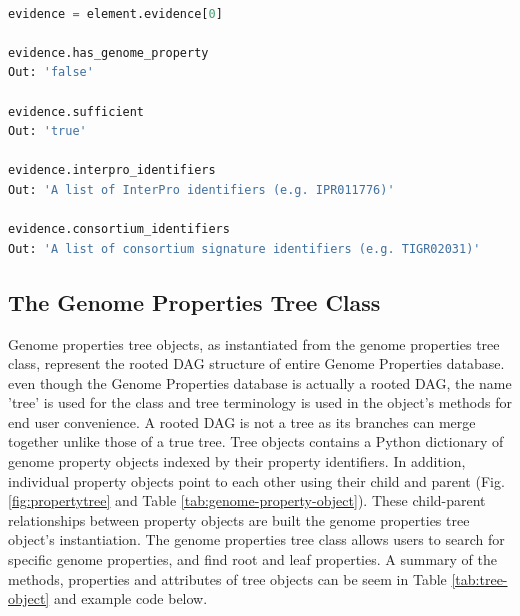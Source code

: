 \begin{lstlisting}[language=Python]

evidence = element.evidence[0]
	
evidence.has_genome_property
Out: 'false'

evidence.sufficient
Out: 'true'

evidence.interpro_identifiers
Out: 'A list of InterPro identifiers (e.g. IPR011776)'

evidence.consortium_identifiers 
Out: 'A list of consortium signature identifiers (e.g. TIGR02031)'

\end{lstlisting}

\subsection{The Genome Properties Tree Class}

Genome properties tree objects, as instantiated from the genome properties tree class, represent the rooted DAG structure of entire Genome Properties database. even though the Genome Properties database is actually a rooted DAG, the name 'tree' is used for the class and tree terminology is used in the object's methods for end user convenience. A rooted DAG is not a tree as its branches can merge together unlike those of a true tree. Tree objects contains a Python dictionary of genome property objects indexed by their property identifiers. In addition, individual property objects point to each other using their child and parent (Fig. \ref{fig:propertytree} and Table \ref{tab:genome-property-object}). These child-parent relationships between property objects are built the genome properties tree object's instantiation. The genome properties tree class allows users to search for specific genome properties, and find root and leaf properties. A summary of the methods, properties and attributes of tree objects can be seem in Table \ref{tab:tree-object} and example code below.

